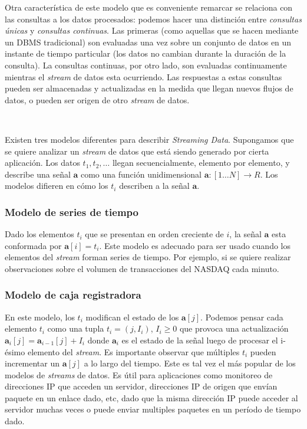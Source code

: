 \documentclass[a4paper,12pt, oneside]{article}
\begin{document}
Otra característica de este modelo que es conveniente remarcar se relaciona con las consultas a los datos procesados: podemos hacer una distinción entre \textit{consultas únicas} y \textit{consultas continuas}\cite{Terry:1992:CQO:141484.130333}. Las primeras (como aquellas que se hacen mediante un DBMS tradicional) son evaluadas una vez sobre un conjunto de datos en un instante de tiempo particular (los datos no cambian durante la duración de la consulta). La consultas continuas, por otro lado, son evaluadas continuamente mientras el \textit{stream} de datos esta ocurriendo. Las respuestas a estas consultas pueden ser almacenadas y actualizadas en la medida que llegan nuevos flujos de datos, o pueden ser origen de otro \textit{stream} de datos.

\

Existen tres modelos diferentes para describir \textit{Streaming Data}. Supongamos que se quiere analizar un \textit{stream} de datos que está siendo generado por cierta aplicación. Los datos $t_1, t_2, \dots$ llegan secuencialmente, elemento por elemento, y describe una señal $\mathbf{a}$ como una función unidimensional $\mathbf{a}: [1 \dots N] \rightarrow R$. Los modelos difieren en cómo los $t_i$ describen a la señal $\mathbf{a}$.

\subsubsection{Modelo de series de tiempo}
Dado los elementos $t_i$ que se presentan en orden creciente de $i$, la señal $\mathbf{a}$ esta conformada por $\mathbf{a}[i]=t_i$. Este modelo es adecuado para ser usado cuando los elementos del \textit{stream} forman series de tiempo. Por ejemplo, si se quiere realizar observaciones sobre el volumen de transacciones del NASDAQ cada minuto.
\subsubsection{Modelo de caja registradora}
En este modelo, los $t_i$ modifican el estado de los $\textbf{a}[j]$. Podemos pensar cada elemento $t_i$ como una tupla $t_i = (j, I_i)$, $I_i \geq 0$ que provoca una actualización $\textbf{a}_i[j] = \textbf{a}_{i-1} [j] + I_i$ donde $\textbf{a}_i$ es el estado de la señal luego de procesar el i-ésimo elemento del \textit{stream}. Es importante observar que múltiples $t_i$ pueden incrementar un $\textbf{a}[j]$ a lo largo del tiempo. Este es tal vez el más popular de los modelos de \textit{streams} de datos. Es útil para aplicaciones como monitoreo de direcciones IP que acceden un servidor, direcciones IP de origen que envían paquete en un enlace dado, etc, dado que la misma dirección IP puede acceder al servidor muchas veces o puede enviar multiples paquetes en un período de tiempo dado.
\end{document}
